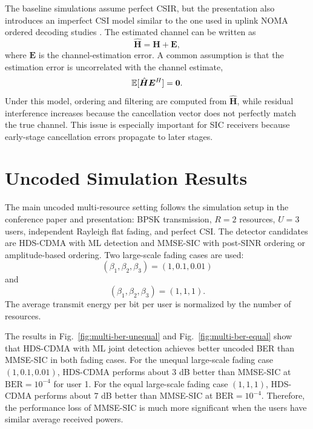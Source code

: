 The baseline simulations assume perfect CSIR, but the presentation also introduces an imperfect CSI model similar to the one used in uplink NOMA ordered decoding studies \cite{gao2018imperfect}. The estimated channel can be written as
\begin{equation}
    \hat{\bm{H}}=\bm{H}+\bm{E},
\end{equation}
where $\bm{E}$ is the channel-estimation error. A common assumption is that the estimation error is uncorrelated with the channel estimate,
\begin{equation}
    \mathbb{E}[\hat{\bm{H}}\bm{E}^H]=\bm{0}.
\end{equation}
Under this model, ordering and filtering are computed from $\hat{\bm{H}}$, while residual interference increases because the cancellation vector does not perfectly match the true channel. This issue is especially important for SIC receivers because early-stage cancellation errors propagate to later stages.

\section{Uncoded Simulation Results}

The main uncoded multi-resource setting follows the simulation setup in the conference paper and presentation: BPSK transmission, $R=2$ resources, $U=3$ users, independent Rayleigh flat fading, and perfect CSI. The detector candidates are HDS-CDMA with ML detection and MMSE-SIC with post-SINR ordering or amplitude-based ordering. Two large-scale fading cases are used:
\begin{equation}
    (\beta_1,\beta_2,\beta_3)=(1,0.1,0.01)
\end{equation}
and
\begin{equation}
    (\beta_1,\beta_2,\beta_3)=(1,1,1).
\end{equation}
The average transmit energy per bit per user is normalized by the number of resources.



The results in Fig.~\ref{fig:multi-ber-unequal} and Fig.~\ref{fig:multi-ber-equal} show that HDS-CDMA with ML joint detection achieves better uncoded BER than MMSE-SIC in both fading cases. For the unequal large-scale fading case $(1,0.1,0.01)$, HDS-CDMA performs about $3$ dB better than MMSE-SIC at $\mathrm{BER}=10^{-4}$ for user 1. For the equal large-scale fading case $(1,1,1)$, HDS-CDMA performs about $7$ dB better than MMSE-SIC at $\mathrm{BER}=10^{-4}$. Therefore, the performance loss of MMSE-SIC is much more significant when the users have similar average received powers.

